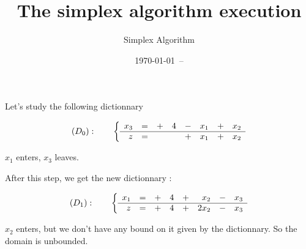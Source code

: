 \documentclass{article}
\title{The simplex algorithm execution}
\author{Simplex Algorithm}
\date{\today ~-- \currenttime}
\begin{document}
 
 
\maketitle 
 
Let's study the following dictionnary 
 
\[ 
(D_0):\qquad \left \{ 
\begin{array}{rc*3{cr}} 
x_3 & =& + &4& - &x_1 & + &x_2 \\ 
\hline 
z & =& && + &x_1 & + &x_2 \end{array} \right. 
\] 
 
$x_1$ enters, $x_3$ leaves. 
 
After this step, we get the new dictionnary : 
 
\[ 
(D_1):\qquad \left \{ 
\begin{array}{rc*3{cr}} 
x_1 & =& + &4& + &x_2 & - &x_3 \\ 
\hline 
z & =& + &4& + &2x_2 & - &x_3 \end{array} \right. 
\] 
 
$x_2$ enters, but we don't have any bound on it given by the dictionnary. So the domain is unbounded. 
 
 
\end{document}
